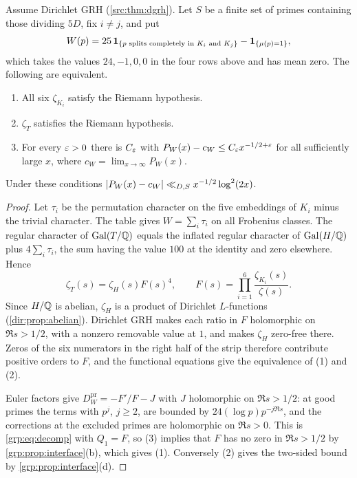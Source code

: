 \begin{theorem}\label{grp:thm:six}
Assume Dirichlet GRH (\cref{src:thm:dgrh}). Let $S$ be a finite set of primes
containing those dividing $5D$, fix $i\ne j$, and put
\[
 W(p)=25\,\mathbf{1}_{\{p\text{ splits completely in }K_i\text{ and }K_j\}}
 -\mathbf{1}_{\{\mu(p)=1\}} ,
\]
which takes the values $24,-1,0,0$ in the four rows above and has mean zero.
The following are equivalent.
\begin{enumerate}[label=\textup{(\arabic*)}]
\item All six $\zeta_{K_i}$ satisfy the Riemann hypothesis.
\item $\zeta_T$ satisfies the Riemann hypothesis.
\item For every $\varepsilon>0$ there is $C_\varepsilon$ with
$P_W(x)-c_W\le C_\varepsilon x^{-1/2+\varepsilon}$ for all sufficiently large $x$, where
$c_W=\lim_{x\to\infty}P_W(x)$.
\end{enumerate}
Under these conditions $\lvert P_W(x)-c_W\rvert\ll_{D,S}x^{-1/2}\log^2(2x)$.
\end{theorem}

\begin{proof}
Let $\tau_i$ be the permutation character on the five embeddings of $K_i$
minus the trivial character. The table gives $W=\sum_i\tau_i$ on all Frobenius
classes. The regular character of $\operatorname{Gal}(T/\mathbb{Q})$ equals the inflated regular
character of $\operatorname{Gal}(H/\mathbb{Q})$ plus $4\sum_i\tau_i$, the sum having the value $100$
at the identity and zero elsewhere. Hence
\[
 \zeta_T(s)=\zeta_H(s)F(s)^4,\qquad
 F(s)=\prod_{i=1}^6\frac{\zeta_{K_i}(s)}{\zeta(s)} .
\]
Since $H/\mathbb{Q}$ is abelian, $\zeta_H$ is a product of Dirichlet $L$-functions
(\cref{dir:prop:abelian}).
Dirichlet GRH makes each ratio in $F$ holomorphic on $\Re s>1/2$, with a
nonzero removable value at $1$, and makes $\zeta_H$ zero-free there. Zeros of
the six numerators in the right half of the strip therefore contribute
positive orders to $F$, and the functional equations give the equivalence of
(1) and (2).

Euler factors give $D^{\mathrm{pr}}_W=-F'/F-J$ with $J$ holomorphic on $\Re s>1/2$: at good
primes the terms with $p^j$, $j\ge2$, are bounded by $24(\log p)p^{-j\Re s}$,
and the corrections at the excluded primes are holomorphic on $\Re s>0$. This
is \eqref{grp:eq:decomp} with $Q_1=F$, so (3) implies that $F$ has no zero in
$\Re s>1/2$ by \cref{grp:prop:interface}(b), which gives (1). Conversely (2)
gives the two-sided bound by \cref{grp:prop:interface}(d).
\end{proof}

